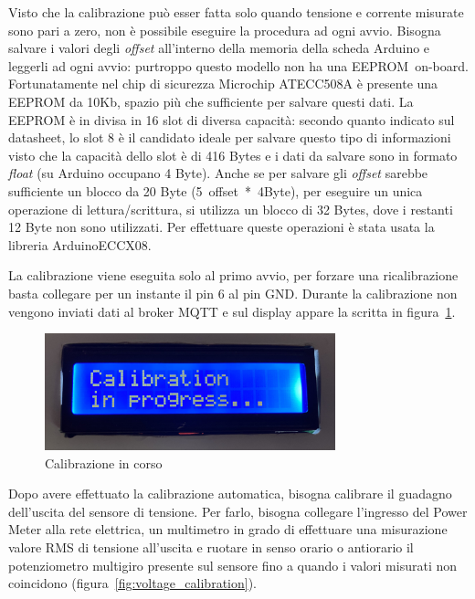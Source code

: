 \documentclass[italian,12pt,a4paper,oneside,final]{report}
\begin{document}
Visto che la calibrazione può esser fatta solo quando tensione e corrente misurate sono pari a zero, non è possibile eseguire la procedura ad ogni avvio.
Bisogna salvare i valori degli \textit{offset} all'interno della memoria della scheda Arduino e leggerli ad ogni avvio: purtroppo questo modello non ha una \mbox{EEPROM on-board}.
Fortunatamente nel chip di sicurezza Microchip ATECC508A è presente una EEPROM da 10Kb, spazio più che sufficiente per salvare questi dati.
La EEPROM è in divisa in 16 slot di diversa capacità: secondo quanto indicato sul datasheet, lo slot 8 è il candidato ideale per salvare questo tipo di informazioni visto che la capacità dello slot è di 416 Bytes e i dati da salvare sono in formato \textit{float} (su Arduino occupano 4 Byte).
Anche se per salvare gli \textit{offset} sarebbe sufficiente un blocco da 20 Byte \mbox{(5 offset * 4Byte)}, per eseguire un unica operazione di lettura/scrittura, si utilizza un blocco di 32 Bytes, dove i restanti 12 Byte non sono utilizzati.
\noindent Per effettuare queste operazioni è stata usata la libreria ArduinoECCX08.

La calibrazione viene eseguita solo al primo avvio, per forzare una ricalibrazione basta collegare per un instante il pin 6 al pin GND.
Durante la calibrazione non vengono inviati dati al broker MQTT e sul display appare la scritta in figura~\ref{fig:calibration_in_progress}.

\begin{figure}[h]
	\centering
	\includegraphics[width=0.75\textwidth]{calibration_in_progress.jpg}
	\caption{Calibrazione in corso}
	\label{fig:calibration_in_progress}
\end{figure}

Dopo avere effettuato la calibrazione automatica, bisogna calibrare il guadagno dell'uscita del sensore di tensione.
Per farlo, bisogna collegare l'ingresso del Power Meter alla rete elettrica, un multimetro in grado di effettuare una misurazione valore RMS di tensione all'uscita e ruotare in senso orario o antiorario il potenziometro multigiro presente sul sensore fino a quando i valori misurati non coincidono (figura~\ref{fig:voltage_calibration}).
\end{document}
